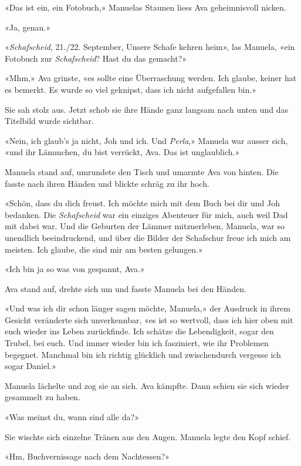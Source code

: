 «Das ist ein, ein Fotobuch,» Manuelas Staunen liess Ava geheimnisvoll
nicken.

«Ja, genau.»

«\emph{Schafscheid}, 21./22. September, Unsere Schafe kehren heim», las
Manuela, «ein Fotobuch zur \emph{Schafscheid}? Hast du das gemacht?»

«Mhm,» Ava grinste, «es sollte eine Überraschung werden. Ich glaube,
keiner hat es bemerkt. Es wurde so viel geknipst, dass ich nicht
aufgefallen bin.»

Sie sah stolz aus. Jetzt schob sie ihre Hände ganz langsam nach unten
und das Titelbild wurde sichtbar.

«Nein, ich glaub’s ja nicht, Joh und ich. Und \emph{Perla},» Manuela war ausser sich, «und ihr Lämmchen, du bist verrückt, Ava. Das ist  unglaublich.»

Manuela stand auf, umrundete den Tisch und umarmte Ava von hinten. Die
fasste nach ihren Händen und blickte schräg zu ihr hoch.

«Schön, dass du dich freust. Ich möchte mich mit dem Buch bei dir und
Joh bedanken. Die \emph{Schafscheid} war ein einziges Abenteuer für
mich, auch weil Dad mit dabei war. Und die Geburten der Lämmer
mitzuerleben, Manuela, war so unendlich beeindruckend, und über die Bilder der Schafschur freue ich mich am meisten. Ich
glaube, die sind mir am besten gelungen.»

«Ich bin ja so was von gespannt, Ava.»

Ava stand auf, drehte sich um und fasste Manuela bei den Händen.

«Und was ich dir schon länger sagen möchte, Manuela,» der Ausdruck in
ihrem Gesicht veränderte sich unverkennbar, «es ist so wertvoll, dass ich hier oben
mit euch wieder ins Leben zurückfinde. Ich schätze die Lebendigkeit,
sogar den Trubel, bei euch. Und immer wieder bin ich fasziniert, wie ihr
Problemen begegnet. Manchmal bin ich richtig glücklich und zwischendurch
vergesse ich sogar Daniel.»

Manuela lächelte und zog sie an sich. Ava kämpfte. 
Dann schien sie sich wieder gesammelt zu haben.

«Was meinst du, wann sind alle da?»

Sie wischte sich einzelne Tränen aus den Augen.
Manuela legte den Kopf schief.

«Hm, Buchvernissage nach dem Nachtessen?»
